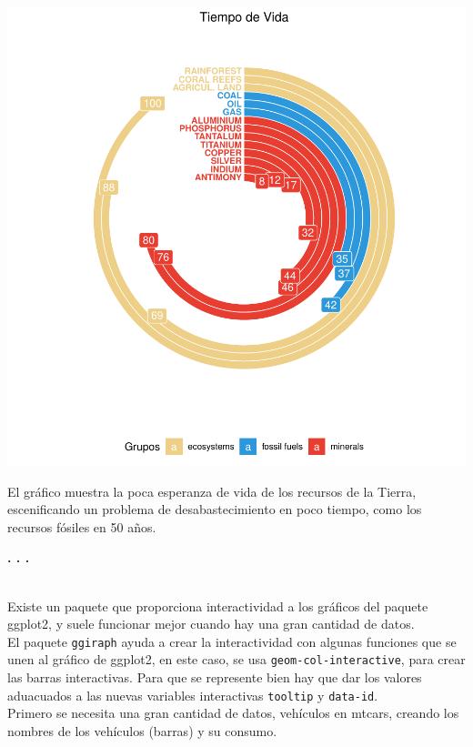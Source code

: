 \documentclass{article}\usepackage[]{graphicx}\usepackage[]{color}
\makeatletter
\def\maxwidth{ %
  \ifdim\Gin@nat@width>\linewidth
    \linewidth
  \else
    \Gin@nat@width
  \fi
}
\newenvironment{knitrout}{}{} %
\makeatother
\begin{document}
\begin{knitrout}
\color{fgcolor}

{\centering \includegraphics[width=\maxwidth]{figure/plot_br_final-1} 

}



\end{knitrout}
El gr\'afico muestra la poca esperanza de vida de los recursos de la Tierra, escenificando un problema de desabastecimiento en poco tiempo, como los recursos f\'osiles en 50 a\~nos.
\begin{center}
\textbf{. . .}
\end{center}
~\\
Existe un paquete que proporciona interactividad a los gr\'aficos del paquete ggplot2, y suele funcionar mejor cuando hay una gran cantidad de datos.~\\
El paquete \texttt{ggiraph}\cite{docu_ggiraph} ayuda a crear la interactividad con algunas funciones que se unen al gr\'afico de ggplot2, en este caso, se usa \texttt{geom-col-interactive}, para crear las barras interactivas. Para que se represente bien hay que dar los valores aduacuados a las nuevas variables interactivas \texttt{tooltip} y \texttt{data-id}.~\\
Primero se necesita una gran cantidad de datos, veh\'iculos en mtcars, creando los nombres de los veh\'iculos (barras) y su consumo.
\end{document}
